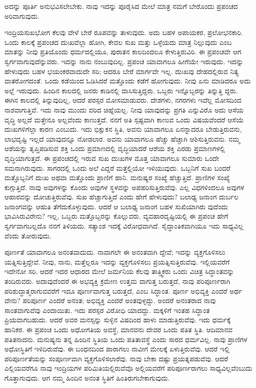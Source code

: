 ಅದನ್ನು ಪೂರ್ತಿ ಅನುಭವಿಸಲೇಬೇಕು. ನಾವು ಇದನ್ನು ಪೂರೈಸಿದ ಮೇಲೆ ಮಾತ್ರ ನಮಗೆ ಬೇರೊಂದು ಪ್ರಪಂಚದ ಅರಿವಾಗುವುದು.

ಇಂದ್ರಿಯಸುಖಭೋಗ ಕೆಲವು ವೇಳೆ ಬೇರೆ ರೂಪವನ್ನು ತಾಳುವುದು. ಅದು ಬಹಳ ಅಪಾಯಕರ, ಪ್ರಲೋಭನಕಾರಿ. ಒಂದು ಕಾಲಕ್ಕೆ ಪ್ರಪಂಚದ ದುಃಖವೆಲ್ಲಾ ಹೋಗಿ, ಕೇವಲ ಸುಖ ಮತ್ತು ಒಳ್ಳೆಯದು ಮಾತ್ರ ನಿಲ್ಲುವುದು ಎಂಬ ಮಾತನ್ನು ನೀವು ಪ್ರತಿಯೊಂದು ಧರ್ಮದಲ್ಲಿಯೂ, ಪುರಾತನ ಕಾಲದಿಂದಲೂ ಕೇಳುತ್ತಿರುವಿರಿ. ಈ ಪ್ರಪಂಚವೇ ಆಗ ಸ್ವರ್ಗವಾಗುವುದೆನ್ನುವರು. ಇದನ್ನು ನಾನು ನಂಬುವುದಿಲ್ಲ. ಪ್ರಪಂಚ ಯಾವಾಗಲೂ ಹೀಗೆಯೇ ಇರುವುದು. ಇದನ್ನು ಹೇಳುವುದು ಬಹಳ ಭಯಂಕರವಾದುದೇ ಸರಿ; ಆದರೂ ಬೇರೆ ಮಾರ್ಗವೇ ಇಲ್ಲ. ದುಃಖವು ದೇಹದಲ್ಲಿರುವ ನಿತ್ಯ ವಾತರೋಗದಂತೆ. ಒಂದು ಕಡೆಯಿಂದ ಓಡಿಸಿದರೆ ಮತ್ತೊಂದು ಕಡೆಗೆ ಹೋಗುವುದು. ನೀವು ಏನು ಮಾಡಿದರೂ ಅದು ಅಲ್ಲೆ ಇರುವುದು. ಹಿಂದಿನ ಕಾಲದಲ್ಲಿ ಜನರು ಕಾಡಿನಲ್ಲಿ ವಾಸಿಸುತ್ತಿದ್ದರು. ಒಬ್ಬರು ಇನ್ನೊಬ್ಬರನ್ನು ತಿನ್ನುತ್ತಿ ದ್ದರು. ಈಗಿನ ಕಾಲದಲ್ಲಿ ತಿನ್ನುವುದಿಲ್ಲ, ಆದರೆ ಪರಸ್ಪರ ಮೋಸಮಾಡುವರು. ದೇಶಗಳು, ನಗರಗಳು ಇವೆಲ್ಲ ಮೋಸದಿಂದ ನಾಶವಾಗುತ್ತಿವೆ. ಇದು ನಾವು ಮುಂದು ವರಿದ ಚಿಹ್ನೆಯಲ್ಲ. ನೀವು ಯಾವುದನ್ನು ಪ್ರಗತಿ ಎನ್ನುವಿರೊ ಅದು ಆಸೆಯ ವೃದ್ಧಿ ಅಲ್ಲದೆ ಮತ್ತೇನೂ ಅಲ್ಲವೆಂದು ಕಾಣುತ್ತದೆ. ನನಗೆ ಅತಿ ಸ್ಪಷ್ಟವಾಗಿ ಕಾಣುವ ಒಂದು ವಿಷಯವೆಂದರೆ ಆಸೆಯೆ ದುಃಖಗಳಿಗೆಲ್ಲಾ ಕಾರಣ ಎಂಬುದು. ಇದು ಭಿಕ್ಷುಕನ ಸ್ಥಿತಿ, ಅವನು ಯಾವಾಗಲೂ ಏನನ್ನಾದರೂ ಬೇಡುತ್ತಿರುವನು, ಲಾಭದೃಷ್ಟಿ ಇಲ್ಲದೆ ಯಾವುದನ್ನೂ ನೋಡಲಾರ. ಅವನು ಯಾವಾಗಲೂ ಹೆಚ್ಚು ಹೆಚ್ಚಾಗಿ ಆಶಿಸುತ್ತಿರುವನು. ನಮ್ಮ ಆಶೆಯನ್ನು ತೃಪ್ತಿಪಡಿಸುವ ಶಕ್ತಿ ಒಂದು ಪ್ರಮಾಣದಲ್ಲಿ ವೃದ್ಧಿಯಾದರೆ ಆಶೆಯ ಶಕ್ತಿ ಎರಡು ಪ್ರಮಾಣಗಳಲ್ಲಿ ವೃದ್ಧಿಯಾಗುತ್ತದೆ. ಈ ಪ್ರಪಂಚದಲ್ಲಿ ಇರುವ ಸುಖ ದುಃಖಗಳ ಮೊತ್ತ ಯಾವಾಗಲೂ ಸುಮಾರು ಒಂದೇ ಸಮನಾಗಿರುವುದು. ಸಾಗರದಲ್ಲಿ ಒಂದು ಅಲೆ ಎದ್ದರೆ ಮತ್ತೆಲ್ಲಿಯೋ ಇಳಿಯುವುದು. ಒಬ್ಬನಿಗೆ ಸುಖ ಬಂದರೆ ಮತ್ತೊಬ್ಬನಿಗೆ ದುಃಖ ಅಥವಾ ಮತ್ತೊಂದು ಪ್ರಾಣಿಗೆ ಹಾನಿ. ಮನುಷ್ಯರ ಸಂಖ್ಯೆ ಹೆಚ್ಚುತ್ತಿದೆ. ಪ್ರಾಣಿಗಳ ಸಂಖ್ಯೆ ಕುಗ್ಗುತ್ತಿದೆ. ನಾವು ಅವುಗಳನ್ನು ಕೊಂದು ಅವುಗಳ ಸ್ಥಳವನ್ನು ಅಪಹರಿಸುತ್ತಿರುವೆವು. ಎಲ್ಲ ವಿಧಗಳಿಂದಲೂ ಅವುಗಳ ಆಹಾರವನ್ನು ದೋಚುತ್ತಿರುವೆವು. ಸುಖ ಹೆಚ್ಚಾಗುತ್ತಿದೆ ಎಂದು ಹೇಗೆ ಹೇಳುವುದು? ಬಲಾಢ್ಯ ಜನಾಂಗ ದುರ್ಬಲ ಜನಾಂಗವನ್ನು ಆಹುತಿ ತೆಗೆದುಕೊಳ್ಳುವುದು. ಆದರೆ ಆ ಬಲಾಢ್ಯ ಜನಾಂಗ ಬಹಳ ಸುಖಿಯಾಗಿರು ವುದೆಂದು ಭಾವಿಸಿರುವಿರೇನು? ಇಲ್ಲ, ಒಬ್ಬರು ಮತ್ತೊಬ್ಬರನ್ನು ಕೊಲ್ಲುವರು. ವ್ಯವಹಾರದೃಷ್ಟಿಯಲ್ಲಿ ಈ ಪ್ರಪಂಚ ಹೇಗೆ ಸ್ವರ್ಗವಾಗಬಲ್ಲದೊ ನನಗೆ ತಿಳಿಯದು. ಸತ್ಯಾಂಶ ಇದಕ್ಕೆ ವಿರೋಧವಾಗಿದೆ. ಸೈದ್ಧಾಂತಿಕವಾಗಿಯೂ ಇದು ಸಾಧ್ಯವಿಲ್ಲ ವೆಂದು ತೋರುವುದು.

ಪೂರ್ಣತೆ ಯಾವಾಗಲೂ ಅನಂತವಾದುದು. ನಾವಾಗಲೇ ಈ ಅನಂತವಾಗಿ ದ್ದೇವೆ; ಇದನ್ನು ವ್ಯಕ್ತಗೊಳಿಸಲು ಯತ್ನಿಸುತ್ತಿದ್ದೇವೆ. ನೀವು, ನಾನು, ಮತ್ತೆಲ್ಲರೂ ಇದನ್ನು ವ್ಯಕ್ತಗೊಳಿಸಲು ಪ್ರಯತ್ನಿಸುತ್ತಿರುವೆವು. ಇಲ್ಲಿಯವರೆಗೆ ಇದೇನೋ ಸರಿ. ಆದರೆ ಇದರ ಆಧಾರದ ಮೇಲೆ ಜರ್ಮನಿಯ ಕೆಲವು ತಾತ್ತ್ವಿಕರು ಒಂದು ವಿಚಿತ್ರ ಸಿದ್ಧಾಂತವನ್ನು ತಂದಿರುವರು. ಅದಾವುದೆಂದರೆ ಈ ಅಭವ್ಯಕ್ತಿ ಕ್ರಮೇಣ ಉತ್ತಮ ವಾಗುತ್ತ ಬರುತ್ತದೆ, ನಾವು ಪರಿಪೂರ್ಣರಾಗಿ ಪರಿಶುದ್ಧಾತ್ಮರಾಗುವವರೆಗೆ ಇದೂ ಪೂರ್ಣವಾಗುತ್ತ ಬರುತ್ತದೆ, ಎಂಬ ಸಿದ್ಧಾಂತ. ಪೂರ್ಣ ಅಭಿವ್ಯಕ್ತಿ ಎಂದರೆ ಅರ್ಥ ವೇನು? ಪರಿಪೂರ್ಣ ಎಂದರೆ ಅನಂತ; ಅಭಿವ್ಯಕ್ತಿ ಎಂದರೆ ಅಂತವುಳ್ಳದ್ದು. ಅಂದರೆ ಅನಂತರಾದ ನಾವು ಸಾಂತವಾಗುವೆವು ಎಂದಾಯಿತು. ಇದು ಪರಸ್ಪರ ವಿರೋಧಿ ಯಾದದ್ದು. ಮಕ್ಕಳಿಗೆ ಇಂತಹ ಸಿದ್ಧಾಂತ ಪ್ರಿಯವಾಗಬಹುದು. ಆದರೆ ಅವರ ಮನಸ್ಸನ್ನು ಸುಳ್ಳಿನ ವಿಷದಿಂದ ಹಾಳು ಮಾಡುತ್ತಿರುವೆವು. ಇದು ಧರ್ಮಕ್ಕೆ ಹಾನಿಕರ. ಈ ಪ್ರಪಂಚ ಒಂದು ಅಧೋಗತಿಯ ಅವಸ್ಥೆ, ಮಾನವನು ದೇವರ ಒಂದು ಪತಿತ ಸ್ಥಿತಿ. ಆದಿಮಾನವ ಪತಿತನಾದನು. ಮನುಷ್ಯನು ತನ್ನ ಹಿಂದಿನ ಸ್ಥಿತಿಯ ಒಂದು ಪತಿತಾವಸ್ಥೆ ಎಂದು ಸಾರದ ಧರ್ಮವಿಲ್ಲ. ನಾವು ಪ್ರಾಣಿಗಳ ಅಧೋಸ್ಥಿತಿಗೆ ಇಳಿದಿರುವೆವು. ಈ ಬಂಧನದಿಂದ ಪಾರಾಗಲು ನಾವೀಗ ಮೇಲಕ್ಕೆ ಏಳುತ್ತಿರುವೆವು. ಆದರೆ ಇಲ್ಲಿ ಪರಿಪೂರ್ಣತೆಯನ್ನು ಸಂಪೂರ್ಣವಾಗಿ ವ್ಯಕ್ತಗೊಳಿಸಲಾರೆವು. ನಾವು ಬೇಕಾ ದಷ್ಟು ಪ್ರಯತ್ನಪಡುವೆವು. ಆದರೆ ಎಲ್ಲಿಯವರೆಗೂ ನಾವು ಇಂದ್ರಿಯಗಳ ಪರಿಮಿತಿಯಲ್ಲಿರುವೆವೊ ಅಲ್ಲಿಯವರೆಗೆ ಪರಿಪೂರ್ಣರಾಗಲು ಸಾಧ್ಯವಿಲ್ಲವೆಂಬುದು ಗೊತ್ತಾಗುವುದು. ಆಗ ನಮ್ಮ ಹಿಂದಿನ ಅನಂತ ಸ್ಥಿತಿಗೆ ಹಿಂತಿರುಗಬೇಕಾಗುವುದು.

